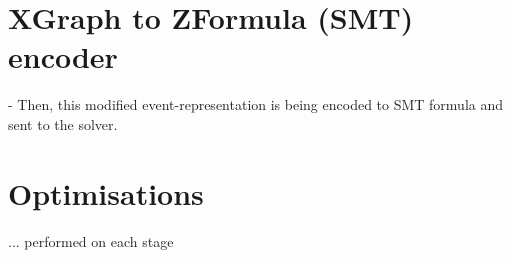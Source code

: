 \section{XGraph to ZFormula (SMT) encoder}
\label{section:impl:comp:zformula}

- Then, this modified event-representation is being encoded to SMT formula and sent to the solver.



\section{Optimisations}

... performed on each stage